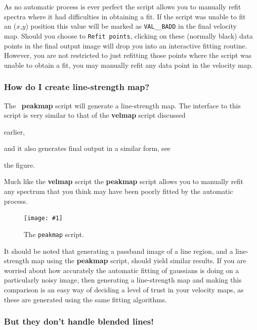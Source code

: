 \documentclass[twoside,11pt]{article}
\newcommand{\htmladdimg}[1]{}
\newcommand{\htmlref}[2]{#1}
\newcommand{\xref}[3]{#1}
\newcommand{\myfig} [5] {
  \begin{figure}
    \centering\texttt{[image: \#1]}
    \typeout{#1 inserted on page \arabic{page}}
    \caption{\label{#4}#5}
  \end{figure}
  }
\newcommand{\myfig}[5]{
    \label{#4} \htmladdimg{#3}\\
    Figure: #5\\
    }
\begin{document}
\begin{\htmlonly}
{As no automatic process is ever perfect the script allows you to
manually refit spectra where it had difficulties in obtaining a fit.
If the script was unable to fit an ($x$,$y$) position this value will be
marked as {\tt VAL\_\_BADD} in the final velocity map.  Should you choose
to {\tt Refit points}, clicking on these (normally black) data points in
the final output image will drop you into an interactive fitting
routine.  However, you are not restricted to just refitting those points
where the script was unable to obtain a fit, you may manually refit
any data point in the velocity map.

\subsubsection{How do I create line-strength map?}

The \DATACUBE\ \xref{{\bf peakmap}}{sun237}{peakmap} script will
generate a line-strength map.  The interface to this script is very
similar to that of the \xref{{\bf velmap}}{sun237}{velmap} script
discussed 
\begin{htmlonly}
\htmlref{earlier}{sc16_velmap}, 
\end{htmlonly}
and it also generates final output in a similar form, see
\begin{htmlonly}
the figure.
\end{htmlonly}
  Much like the {\bf velmap} script the
{\bf peakmap} script allows you to manually refit any spectrum that
you think may have been poorly fitted by the automatic process.

\myfig{sc16_peakmap.eps}{height=0.4\textheight}{sc16_peakmap.gif}{sc16_peakmap_fig}{The {\tt peakmap} script.}

It should be noted that generating a \xref{passband
image}{sun237}{passband} of a line region, and a line-strength map
using the {\bf peakmap} script, should yield similar results.  If you
are worried about how accurately the automatic fitting of gaussians is
doing on a particularly noisy image, then generating a line-strength
map and making this comparison is an easy way of deciding a level of
trust in your \htmlref{velocity maps}{sc16_velmap}, as these are
generated using the same fitting algorithms.

\subsubsection{But they don't handle blended lines!}

}
\end{\htmlonly}
\end{document}
